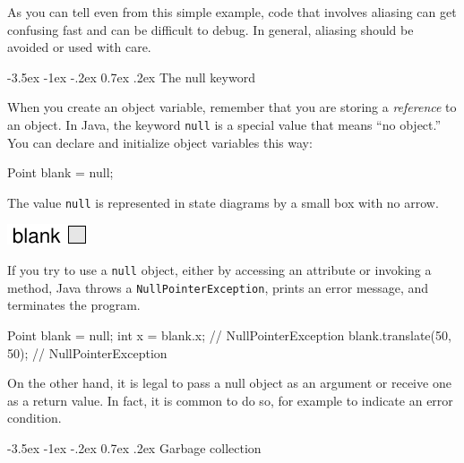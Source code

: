 \documentclass[12pt]{book}
\makeatletter
\theoremstyle{exercise}
\newcommand{\java}[1]{\verb"#1"}
\renewcommand{\section}{\@startsection{section}{1}{\z@}%
    {-3.5ex \@plus -1ex \@minus -.2ex}%
    {0.7ex \@plus.2ex}%
    {\normalfont\Large\bfseries}}
\newcommand{\java}[1]{\lstinline{#1}} %
\makeatother
\begin{document}
As you can tell even from this simple example, code that involves aliasing can get confusing fast and can be difficult to debug.
In general, aliasing should be avoided or used with care.


\section{The null keyword}


When you create an object variable, remember that you are storing a {\em reference} to an object.
In Java, the keyword \java{null} is a special value that means ``no object.''
You can declare and initialize object variables this way:


\begin{code}
    Point blank = null;
\end{code}

The value \java{null} is represented in state diagrams by a small box with no arrow.

\begin{center}
\includegraphics{figs/reference2.pdf}
\end{center}


If you try to use a \java{null} object, either by accessing an attribute or invoking a method, Java throws a \java{NullPointerException}, prints an error message, and terminates the program.

\begin{code}
    Point blank = null;
    int x = blank.x;              // NullPointerException
    blank.translate(50, 50);      // NullPointerException
\end{code}

On the other hand, it is legal to pass a null object as an argument or receive one as a return value.
In fact, it is common to do so, for example to indicate an error condition.


\section{Garbage collection}
\end{document}
